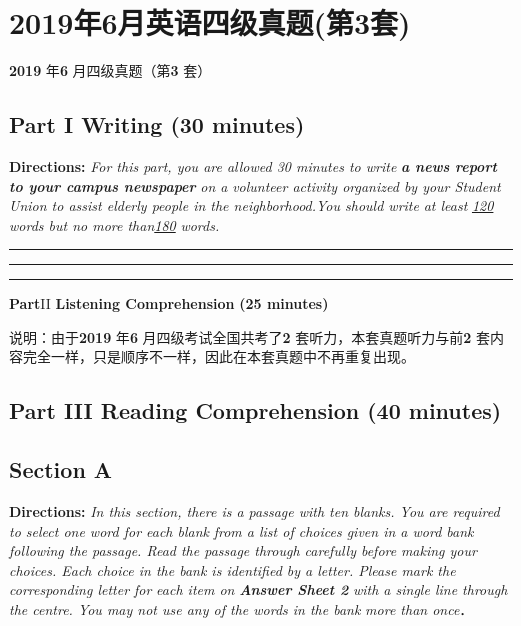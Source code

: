 \documentclass[UTF8,11pt]{ctexart}
\begin{document}
\section*{2019年6月英语四级真题(第3套)}
\textbf{2019} 年\textbf{6} 月四级真题（第\textbf{3} 套）


\subsection*{\textbf{Part I} \textbf{Writing} \textbf{(30 minutes)}}


\textbf{Directions:}\textit{ For this part, you are allowed 30 minutes to write}\textbf{\textit{ a news report to your campus newspaper}}\textit{ on a} \textit{volunteer activity organized by your Student Union to assist elderly people in the neighborhood.You should write} \textit{at least }\textit{\uline{120}}\textit{ words but no more than}\textit{\uline{180}}\textit{ words.} \par\noindent\rule{.95\linewidth}{.4pt}\par  \par\noindent\rule{.95\linewidth}{.4pt}\par  \par\noindent\rule{.95\linewidth}{.4pt}\par  \textbf{Part}II \textbf{Listening Comprehension} \textbf{(25 minutes)}


说明：由于\textbf{2019} 年\textbf{6} 月四级考试全国共考了\textbf{2} 套听力，本套真题听力与前\textbf{2} 套内容完全一样，只是顺序不一样，因此在本套真题中不再重复出现。


\subsection*{\textbf{Part III} \textbf{Reading Comprehension} \textbf{(40 minutes)}}


\subsection*{\textbf{Section A}}


\textbf{Directions:}\textit{ In this section, there is a passage with ten blanks. You are required to select one word for each blank} \textit{from a list of choices given in a word bank following the passage. Read the passage through carefully before} \textit{making your choices. Each choice in the bank is identified by a letter. Please mark the corresponding letter for} \textit{each item on}\textbf{\textit{ Answer Sheet 2}}\textit{ with a single line through the centre. You may not use any of the words in the bank} \textit{more than once}．
\end{document}
